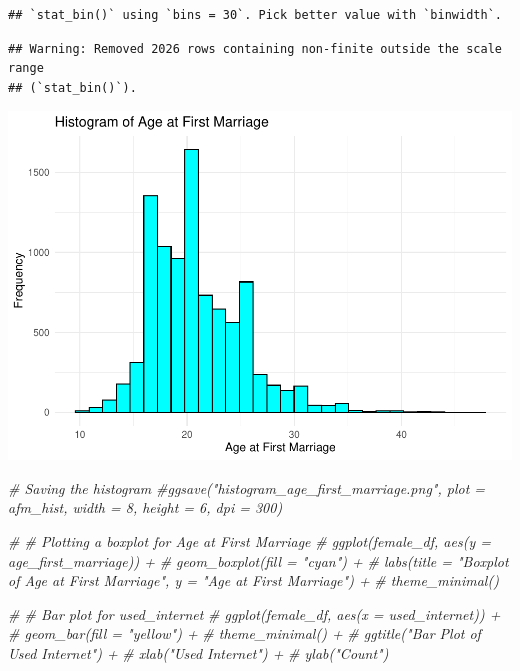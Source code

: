 \documentclass[
]{article}
\newenvironment{Shaded}{\begin{snugshade}}{\end{snugshade}}
\newcommand{\CommentTok}[1]{\textcolor[rgb]{0.56,0.35,0.01}{\textit{#1}}}
\begin{document}
\begin{verbatim}
## `stat_bin()` using `bins = 30`. Pick better value with `binwidth`.
\end{verbatim}

\begin{verbatim}
## Warning: Removed 2026 rows containing non-finite outside the scale range
## (`stat_bin()`).
\end{verbatim}

\includegraphics{ChildMarriage_files/figure-latex/unnamed-chunk-12-1.pdf}

\begin{Shaded}
\begin{Highlighting}[]
\CommentTok{\# Saving the histogram}
\CommentTok{\#ggsave("histogram\_age\_first\_marriage.png", plot = afm\_hist, width = 8, height = 6, dpi = 300)}
\end{Highlighting}
\end{Shaded}

\begin{Shaded}
\begin{Highlighting}[]
\CommentTok{\# \# Plotting a boxplot for \textquotesingle{}Age at First Marriage\textquotesingle{}}
\CommentTok{\# ggplot(female\_df, aes(y = age\_first\_marriage)) +}
\CommentTok{\#   geom\_boxplot(fill = "cyan") +}
\CommentTok{\#   labs(title = "Boxplot of Age at First Marriage", y = "Age at First Marriage") +}
\CommentTok{\#   theme\_minimal()}
\end{Highlighting}
\end{Shaded}

\begin{Shaded}
\begin{Highlighting}[]
\CommentTok{\# \# Bar plot for \textquotesingle{}used\_internet\textquotesingle{}}
\CommentTok{\# ggplot(female\_df, aes(x = used\_internet)) +}
\CommentTok{\#   geom\_bar(fill = "yellow") +}
\CommentTok{\#   theme\_minimal() +}
\CommentTok{\#   ggtitle("Bar Plot of Used Internet") +}
\CommentTok{\#   xlab("Used Internet") +}
\CommentTok{\#   ylab("Count")}
\end{Highlighting}
\end{Shaded}
\end{document}
